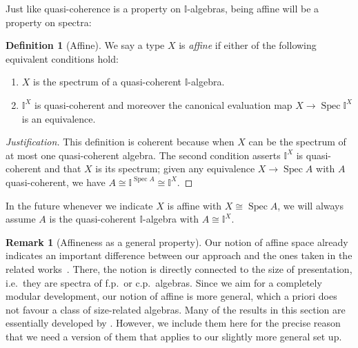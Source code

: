 \documentclass[12pt]{amsart}
\theoremstyle{definition}
\newtheorem{definition}[theorem]{Definition}
\newtheorem{remark}[theorem]{Remark}
\newcommand{\mbb}[1]{\mathbb{#1}}
\newcommand{\I}{\mbb I}
\newcommand{\spec}{\operatorname{Spec}}
\begin{document}
Just like quasi-coherence is a property on $\I$-algebras, being affine will be a property on spectra:

\begin{definition}[Affine]
  We say a type $X$ is \emph{affine} if either of the following equivalent conditions hold:
  \begin{enumerate}
    \item $X$ is the spectrum of a quasi-coherent $\I$-algebra.
    \item $\I^X$ is quasi-coherent and moreover the canonical evaluation map $X \to \spec \I^X$ is an equivalence.
  \end{enumerate}
\end{definition}

\begin{proof}[Justification]
  This definition is coherent because when $X$ can be the spectrum of at most one quasi-coherent algebra. The second condition asserts $\I^X$ is quasi-coherent and that $X$ is its spectrum; given any equivalence $X\to \spec{A}$ with $A$ quasi-coherent, we have
  $
    A\cong \I^{\spec{A}} \cong \I^X
  $.
\end{proof}

In the future whenever we indicate $X$ is affine with $X \cong \spec A$, we will always assume $A$ is the quasi-coherent $\I$-algebra with $A \cong \I^X$.

\begin{remark}[Affineness as a general property]
  Our notion of affine space already indicates an important difference between our approach and the ones taken in the related works~\cite{Cherubini_Coquand_Hutzler_2024,cherubini2024foundation}. There, the notion is directly connected to the size of presentation, i.e.\ they are spectra of f.p.\ or c.p.\ algebras. Since we aim for a completely modular development, our notion of affine is more general, which a priori does not favour a class of size-related algebras. Many of the results in this section are essentially developed by \citet{Cherubini_Coquand_Hutzler_2024}. However, we include them here for the precise reason that we need a version of them that applies to our slightly more general set up.
\end{remark}
\end{document}

